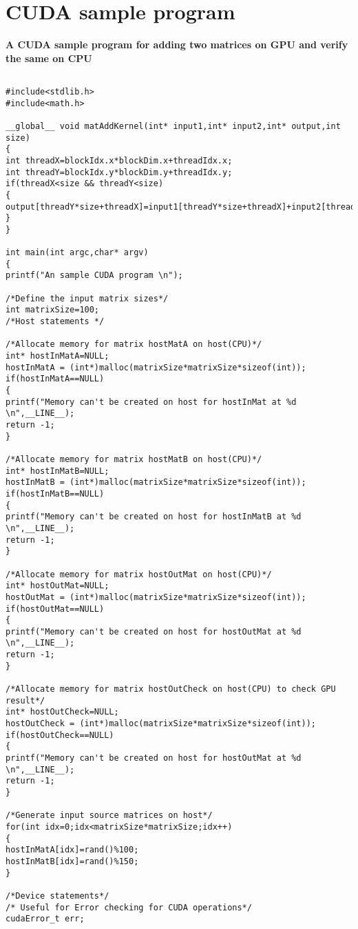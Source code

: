 \appendix
\chapter{CUDA sample program}
{ \textbf{A CUDA sample program for adding two matrices on GPU and verify the same on CPU}}
\scriptsize{
\begin{lstlisting}

#include<stdlib.h>
#include<math.h>

__global__ void matAddKernel(int* input1,int* input2,int* output,int size)
{
int threadX=blockIdx.x*blockDim.x+threadIdx.x;
int threadY=blockIdx.y*blockDim.y+threadIdx.y;
if(threadX<size && threadY<size)
{
output[threadY*size+threadX]=input1[threadY*size+threadX]+input2[threadY*size+threadX];
}
}

int main(int argc,char* argv)
{
printf("An sample CUDA program \n");

/*Define the input matrix sizes*/
int matrixSize=100;
/*Host statements */

/*Allocate memory for matrix hostMatA on host(CPU)*/
int* hostInMatA=NULL;
hostInMatA = (int*)malloc(matrixSize*matrixSize*sizeof(int));
if(hostInMatA==NULL)
{
printf("Memory can't be created on host for hostInMat at %d \n",__LINE__);
return -1;
}

/*Allocate memory for matrix hostMatB on host(CPU)*/
int* hostInMatB=NULL;
hostInMatB = (int*)malloc(matrixSize*matrixSize*sizeof(int));
if(hostInMatB==NULL)
{
printf("Memory can't be created on host for hostInMatB at %d \n",__LINE__);
return -1;
}

/*Allocate memory for matrix hostOutMat on host(CPU)*/
int* hostOutMat=NULL;
hostOutMat = (int*)malloc(matrixSize*matrixSize*sizeof(int));
if(hostOutMat==NULL)
{
printf("Memory can't be created on host for hostOutMat at %d \n",__LINE__);
return -1;
}

/*Allocate memory for matrix hostOutCheck on host(CPU) to check GPU result*/
int* hostOutCheck=NULL;
hostOutCheck = (int*)malloc(matrixSize*matrixSize*sizeof(int));
if(hostOutCheck==NULL)
{
printf("Memory can't be created on host for hostOutMat at %d \n",__LINE__);
return -1;
}

/*Generate input source matrices on host*/
for(int idx=0;idx<matrixSize*matrixSize;idx++)
{
hostInMatA[idx]=rand()%100;
hostInMatB[idx]=rand()%150;
}

/*Device statements*/
/* Useful for Error checking for CUDA operations*/
cudaError_t err;


\end{lstlisting}}
